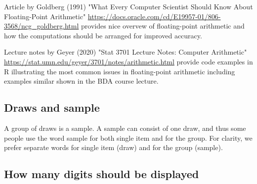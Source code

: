 \documentclass[a4paper,11pt,english]{article}
\begin{document}
Article by Goldberg (1991) "What Every Computer Scientist Should Know About Floating-Point Arithmetic" \url{https://docs.oracle.com/cd/E19957-01/806-3568/ncg_goldberg.html} provides nice overvew of floating-point arithmetic and how the computations should be arranged for improved accuracy.

Lecture notes by Geyer (2020) "Stat 3701 Lecture Notes: Computer Arithmetic" \url{https://stat.umn.edu/geyer/3701/notes/arithmetic.html} provide code examples in R illustrating the most common issues in floating-point arithmetic including examples similar shown in the BDA course lecture.
 
 \subsection*{Draws and sample}

 A group of draws is a sample. A sample can consist of one draw, and
 thus some people use the word sample for both single item and for the
 group. For clarity, we prefer separate words for single item (draw)
 and for the group (sample).
 
  \subsection*{How many digits should be displayed}
\end{document}
